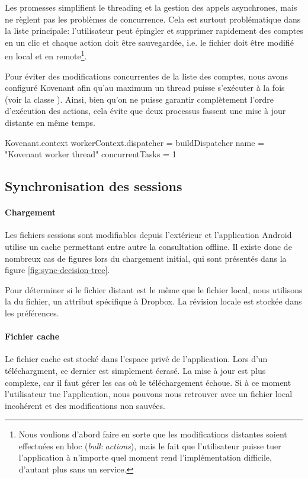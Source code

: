 Les promesses simplifient le threading et la gestion des appels asynchrones, mais ne règlent pas les problèmes de concurrence. Cela est surtout problématique dans la liste principale: l'utilisateur peut épingler et supprimer rapidement des comptes en un clic et chaque action doit être sauvegardée, i.e. le fichier doit être modifié en local et en remote\footnote{Nous voulions d'abord faire en sorte que les modifications distantes soient effectuées en bloc (\emph{bulk actions}), mais le fait que l'utilisateur puisse tuer l'application à n'importe quel moment rend l'implémentation difficile, d'autant plus sans un service.}.

Pour éviter des modifications concurrentes de la liste des comptes, nous avons configuré Kovenant afin qu'au maximum un thread puisse s'exécuter à la fois (voir la classe ). Ainsi, bien qu'on ne puisse garantir complètement l'ordre d'exécution des actions, cela évite que deux processus fassent une mise à jour distante en même temps.

\begin{kotlincode}
Kovenant.context {
    workerContext.dispatcher = buildDispatcher {
        name = "Kovenant worker thread"
        concurrentTasks = 1
    }
}
\end{kotlincode}    

\subsection{Synchronisation des sessions}

\paragraph*{Chargement} Les fichiers sessions sont modifiables depuis l'extérieur et l'application Android utilise un cache permettant entre autre la consultation offline. Il existe donc de nombreux cas de figures lors du chargement initial, qui sont présentés dans la figure \ref{fig:sync-decision-tree}.


Pour déterminer si le fichier distant est le même que le fichier local, nous utilisons la  du fichier, un attribut spécifique à Dropbox. La révision locale est stockée dans les préférences.

\paragraph*{Fichier cache} Le fichier cache est stocké dans l'espace privé de l'application. Lors d'un téléchargment, ce dernier est simplement écrasé. La mise à jour est plus complexe, car il faut gérer les cas où le téléchargement échoue. Si à ce moment l'utilisateur tue l'application, nous pouvons nous retrouver avec un fichier local incohérent et des modifications non sauvées. 

